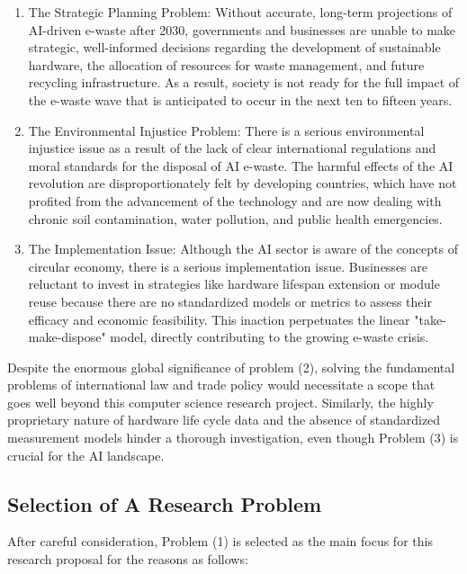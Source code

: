 \documentclass[a4paper, 12pt]{article}
\begin{document}
\begin{enumerate}
    \item The Strategic Planning Problem: Without accurate, long-term projections of AI-driven e-waste after 2030, governments and businesses are unable to make strategic, well-informed decisions regarding the development of sustainable hardware, the allocation of resources for waste management, and future recycling infrastructure. As a result, society is not ready for the full impact of the e-waste wave that is anticipated to occur in the next ten to fifteen years.
 
	\item The Environmental Injustice Problem: There is a serious environmental injustice issue as a result of the lack of clear international regulations and moral standards for the disposal of AI e-waste.  The harmful effects of the AI revolution are disproportionately felt by developing countries, which have not profited from the advancement of the technology and are now dealing with chronic soil contamination, water pollution, and public health emergencies.
	
    \item The Implementation Issue: Although the AI sector is aware of the concepts of circular economy, there is a serious implementation issue.  Businesses are reluctant to invest in strategies like hardware lifespan extension or module reuse because there are no standardized models or metrics to assess their efficacy and economic feasibility. This inaction perpetuates the linear "take-make-dispose" model, directly contributing to the growing e-waste crisis.
\end{enumerate}

Despite the enormous global significance of problem (2), solving the fundamental problems of international law and trade policy would necessitate a scope that goes well beyond this computer science research project.  Similarly, the highly proprietary nature of hardware life cycle data and the absence of standardized measurement models hinder a thorough investigation, even though Problem (3) is crucial for the AI landscape.

\subsection*{Selection of A Research Problem}
After careful consideration, Problem (1) is selected as the main focus for this research proposal for the reasons as follows: 
\end{document}
